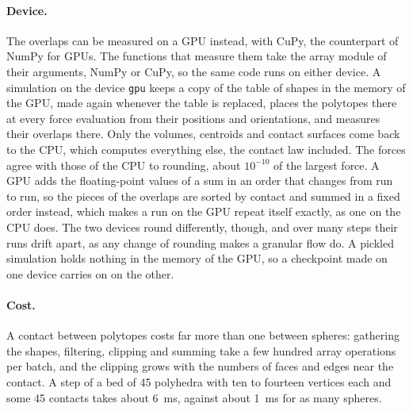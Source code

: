 \paragraph{Device.}
The overlaps can be measured on a GPU instead, with CuPy, the counterpart of NumPy for GPUs.
The functions that measure them take the array module of their arguments, NumPy or CuPy, so the same code runs on either device.
A simulation on the device \texttt{gpu} keeps a copy of the table of shapes in the memory of the GPU, made again whenever the table is replaced, places the polytopes there at every force evaluation from their positions and orientations, and measures their overlaps there.
Only the volumes, centroids and contact surfaces come back to the CPU, which computes everything else, the contact law included.
The forces agree with those of the CPU to rounding, about $10^{-10}$ of the largest force.
A GPU adds the floating-point values of a sum in an order that changes from run to run, so the pieces of the overlaps are sorted by contact and summed in a fixed order instead, which makes a run on the GPU repeat itself exactly, as one on the CPU does.
The two devices round differently, though, and over many steps their runs drift apart, as any change of rounding makes a granular flow do.
A pickled simulation holds nothing in the memory of the GPU, so a checkpoint made on one device carries on on the other.

\paragraph{Cost.}
A contact between polytopes costs far more than one between spheres: gathering the shapes, filtering, clipping and summing take a few hundred array operations per batch, and the clipping grows with the numbers of faces and edges near the contact.
A step of a bed of \num{45} polyhedra with ten to fourteen vertices each and some \num{45} contacts takes about \qty{6}{\milli\second}, against about \qty{1}{\milli\second} for as many spheres.
